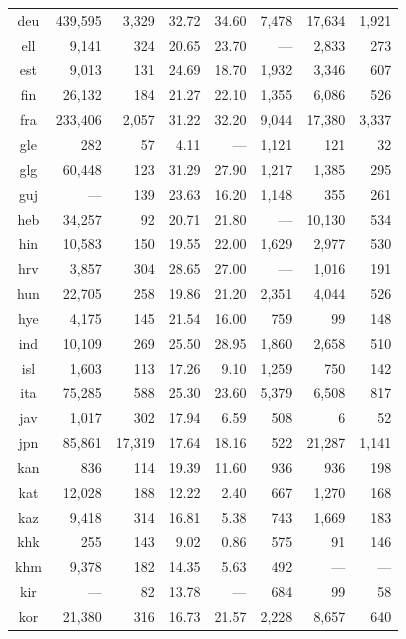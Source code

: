 \begin{table}[!htb]
\begin{tabular}{@{}crrrrrrr@{}}
deu  &  439,595 &  3,329 &  32.72 &  34.60 &  7,478 &  17,634 &  1,921\\
ell  &  9,141 &  324 &  20.65 &  23.70 &   ---  &  2,833 &  273\\
est  &  9,013 &  131 &  24.69 &  18.70 &  1,932 &  3,346 &  607\\
fin  &  26,132 &  184 &  21.27 &  22.10 &  1,355 &  6,086 &  526\\
fra  &  233,406 &  2,057 &  31.22 &  32.20 &  9,044 &  17,380 &  3,337\\
gle  &  282 &  57 &   4.11 &   ---  &  1,121 &  121 &  32\\
glg  &  60,448 &  123 &  31.29 &  27.90 &  1,217 &  1,385 &  295\\
guj  &   ---  &  139 &  23.63 &  16.20 &  1,148 &  355 &  261\\
heb  &  34,257 &  92 &  20.71 &  21.80 &   ---  &  10,130 &  534\\
hin  &  10,583 &  150 &  19.55 &  22.00 &  1,629 &  2,977 &  530\\
hrv  &  3,857 &  304 &  28.65 &  27.00 &   ---  &  1,016 &  191\\
hun  &  22,705 &  258 &  19.86 &  21.20 &  2,351 &  4,044 &  526\\
hye  &  4,175 &  145 &  21.54 &  16.00 &  759 &  99 &  148\\
ind  &  10,109 &  269 &  25.50 &  28.95 &  1,860 &  2,658 &  510\\
isl  &  1,603 &  113 &  17.26 &   9.10 &  1,259 &  750 &  142\\
ita  &  75,285 &  588 &  25.30 &  23.60 &  5,379 &  6,508 &  817\\
jav  &  1,017 &  302 &  17.94 &   6.59 &  508 &  6 &  52\\
jpn  &  85,861 &  17,319 &  17.64 &  18.16 &  522 &  21,287 &  1,141\\
kan  &  836 &  114 &  19.39 &  11.60 &  936 &  936 &  198\\
kat  &  12,028 &  188 &  12.22 &   2.40 &  667 &  1,270 &  168\\
kaz  &  9,418 &  314 &  16.81 &   5.38 &  743 &  1,669 &  183\\
khk  &  255 &  143 &   9.02 &   0.86 &  575 &  91 &  146\\
khm  &  9,378 &  182 &  14.35 &   5.63 &  492 &   ---  &   --- \\
kir  &   ---  &  82 &  13.78 &   ---  &  684 &  99 &  58\\
kor  &  21,380 &  316 &  16.73 &  21.57 &  2,228 &  8,657 &  640\\

\end{tabular}
\end{table}
